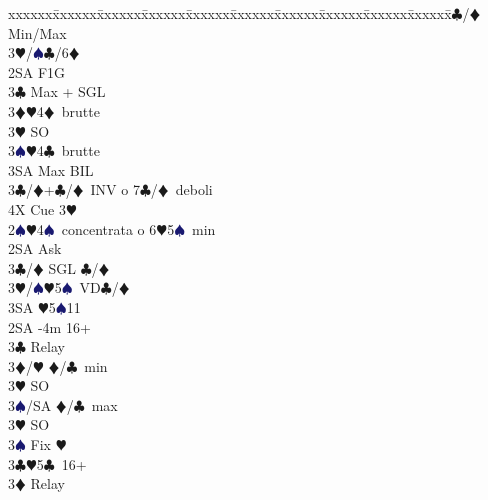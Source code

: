 \documentclass[a4paper,italian]{article}
\newcommand{\BC}{\textcolor{OliveGreen}{$\clubsuit$}}
\newcommand{\BD}{\textcolor{RedOrange}{$\vardiamondsuit$}}
\newcommand{\BH}{\textcolor{Red2}{$\varheartsuit${}}}
\newcommand{\BS}{\textcolor{MidnightBlue}{$\spadesuit${}}}
\newenvironment{bidtable}
{\begin{tabbing}

    xxxxxx\=xxxxxx\=xxxxxx\=xxxxxx\=xxxxxx\=xxxxxx\=xxxxxx\=xxxxxx\=xxxxxx\=xxxxxx\=\kill}
{\end{tabbing} }%
\begin{document}
\begin{multicols*}{2}
\begin{bidtable}
                                            3\BC/\BD \> Min/Max\\
                                            3\BH/\BS {}\BC /6\BD \-\-\\
                                            2SA \> F1G\+\\
                                            3\BC \> Max + SGL\\
                                            3\BD {}\BH4\BD\ brutte\\
                                            3\BH \> SO\\
                                            3\BS {}\BH4\BC\ brutte\\
                                            3SA \> Max BIL\-\\
                                            3\BC/\BD {}+\BC/\BD\ INV o 7\BC/\BD\ deboli\\
                                            4X \> Cue 3\BH \-\\
                                            2\BS {}\BH 4\BS\ concentrata o 6\BH 5\BS\ min\+\\
                                            2SA \> Ask\+\\
                                            3\BC/\BD \> SGL \BC /\BD \\
                                            3\BH/\BS {}\BH 5\BS\ VD\BC /\BD \\
                                            3SA \BH 5\BS 11\-\-\\
                                            2SA -4m 16+\+\\
                                            3\BC \> Relay\+\\
                                            3\BD/\BH \> \BD /\BC\ min\+\\
                                            3\BH \> SO\-\\
                                            3\BS/SA \> \BD /\BC\ max\-\\
                                            3\BH \> SO\\
                                            3\BS \> Fix \BH\-\\
                                            3\BC {}\BH 5\BC\ 16+\+\\
                                            3\BD \> Relay\+\\

\end{bidtable}
\end{multicols*}
\end{document}
